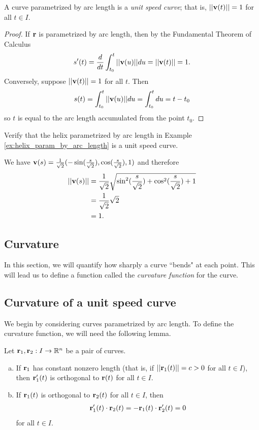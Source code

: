 \documentclass[12pt,letterpaper,reqno]{article}
\numberwithin{equation}{section}
\newcommand{\R}{\ensuremath{\mathbb R}}
\newcommand{\bv}{{\bf v}}
\newcommand{\bbr}{{\bf r}}
\begin{document}
{\begin{prop}
	A curve parametrized by arc length is a \emph{unit speed curve}; that is, $||\bv(t)||=1$ for all $t \in I$.
\end{prop}

\begin{proof}
	If $\bbr$ is parametrized by arc length, then by the Fundamental Theorem of Calculus
	\begin{align*}
		s'(t)=\frac{d}{dt}\int_{t_0}^t||\bv(u)||du=||\bv(t)||=1.
	\end{align*}
	Conversely, suppose $||\bv(t)||=1$ for all $t$. Then
	\begin{align*}
		s(t)=\int_{t_0}^t||\bv(u)||du=\int_{t_0}^tdu=t-t_0
	\end{align*}
	so $t$ is equal to the arc length accumulated from the point $t_0$.
\end{proof}

\begin{exercise}
Verify that the helix parametrized by arc length in Example \ref{ex:helix_param_by_arc_length} is a unit speed curve.	
\end{exercise}

{\color{red}
\begin{solution}
We have $\bv(s)=\frac{1}{\sqrt{2}}(-\sin(\frac{s}{\sqrt{2}}), \cos(\frac{s}{\sqrt{2}}),1)$ and therefore 
\begin{align*}
	||\bv(s)||&=\frac{1}{\sqrt{2}}\sqrt{\sin^2(\frac{s}{\sqrt{2}})+\cos^2(\frac{s}{\sqrt{2}})+1} \\
	&=\frac{1}{\sqrt{2}}\sqrt{2} \\
	&=1.
\end{align*}	
\end{solution}

}
\subsection{Curvature}
In this section, we will quantify how sharply a curve ``bends" at each point. This will lead us to define a function called the \emph{curvature function} for the curve.

\subsection{Curvature of a unit speed curve}
We begin by considering curves parametrized by arc length. To define the curvature function, we will need the following lemma.
\begin{lem}\label{lem:some_dot_products}
Let $\bbr_1, \bbr_2:I \to \R^n$ be a pair of curves.
\begin{enumerate}[(a)]
	\item If $\bbr_1$ has constant nonzero length (that is, if $||\bbr_1(t)||=c>0$ for all $t \in I$), then $\bbr_1'(t)$ is orthogonal to $\bbr(t)$ for all $t \in I$.
	\item If $\bbr_1(t)$ is orthogonal to $\bbr_2(t)$ for all $t \in I$, then
	\begin{align*}
		\bbr_1'(t) \cdot \bbr_2(t)=-\bbr_1(t) \cdot \bbr_2'(t)=0
	\end{align*}
	for all $t \in I$.
\end{enumerate}	
\end{lem}

}
\end{document}

